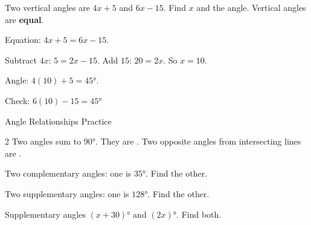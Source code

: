\begin{stepExample}{Two vertical angles are $4x + 5$ and $6x - 15$. Find $x$ and the angle.}
     Vertical angles are \textbf{equal}.

     Equation: $4x + 5 = 6x - 15$.

     Subtract $4x$: $5 = 2x - 15$. Add $15$: $20 = 2x$. So $x = 10$.\par
    Angle: $4(10) + 5 = 45°$.

     Check: $6(10) - 15 = 45°$ \checkmark
\end{stepExample}


\newpage
\begin{stepPractice}{Angle Relationships Practice}
    \resetProblems

    \begin{multicols}{2}
    \prob Two angles sum to $90°$. They are \answerBlank[2.5cm].
    \prob Two opposite angles from intersecting lines are \answerBlank[2.5cm].
    \end{multicols}

    \prob Two complementary angles: one is $35°$. Find the other. \answerBlank[2cm]

    \prob Two supplementary angles: one is $128°$. Find the other. \answerBlank[2cm]

    \prob Supplementary angles $(x + 30)°$ and $(2x)°$. Find both. \answerBlank[3cm]

\end{stepPractice}
